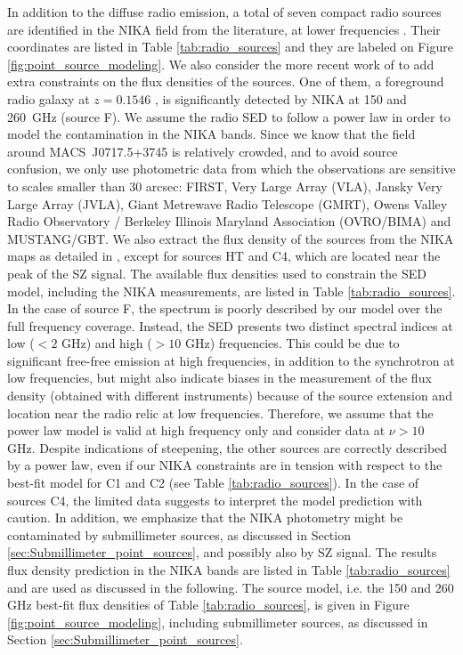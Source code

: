 \documentclass[twocolumn,traditabstract]{aa}
\begin{document}
In addition to the diffuse radio emission, a total of seven compact radio sources are identified in the NIKA field from the literature, at lower frequencies \citep{Condon1998,LaRoque2003,Coble2007,Bonafede2009,vanWeeren2009,Mroczkowski2012,PandeyPommier2013}. Their coordinates are listed in Table \ref{tab:radio_sources} and they are labeled on Figure  \ref{fig:point_source_modeling}. We also consider the more recent work of \cite{vanWeeren2016} to add extra constraints on the flux densities of the sources. One of them, a foreground radio galaxy at $z=0.1546$ \citep{vanWeeren2009}, is significantly detected by NIKA at 150 and 260~GHz (source F). We assume the radio SED to follow a power law in order to model the contamination in the NIKA bands. Since we know that the field around \mbox{MACS~J0717.5+3745} is relatively crowded, and to avoid source confusion, we only use photometric data from which the observations are sensitive to scales smaller than 30 arcsec: FIRST, Very Large Array (VLA), Jansky Very Large Array (JVLA), Giant Metrewave Radio Telescope (GMRT), Owens Valley Radio Observatory / Berkeley Illinois Maryland Association (OVRO/BIMA) and MUSTANG/GBT. We also extract the flux density of the sources from the NIKA maps as detailed in \cite{Adam2016}, except for sources HT and C4, which are located near the peak of the SZ signal. The available flux densities used to constrain the SED model, including the NIKA measurements, are listed in Table \ref{tab:radio_sources}. In the case of source F, the spectrum is poorly described by our model over the full frequency coverage. Instead, the SED presents two distinct spectral indices at low ($<2$ GHz) and high ($>10$ GHz) frequencies. This could be due to significant free-free emission at high frequencies, in addition to the synchrotron at low frequencies, but might also indicate biases in the measurement of the flux density (obtained with different instruments) because of the source extension and location near the radio relic at low frequencies. Therefore, we assume that the power law model is valid at high frequency only and consider data at $\nu > 10$ GHz. Despite indications of steepening, the other sources are correctly described by a power law, even if our NIKA constraints are in tension with respect to the best-fit model for C1 and C2 (see Table \ref{tab:radio_sources}). In the case of sources C4, the limited data suggests to interpret the model prediction with caution. In addition, we emphasize that the NIKA photometry might be contaminated by submillimeter sources, as discussed in Section \ref{sec:Submillimeter_point_sources}, and possibly also by SZ signal. The results flux density prediction in the NIKA bands are listed in Table \ref{tab:radio_sources} and are used as discussed in the following. The source model, i.e. the 150 and 260 GHz best-fit flux densities of Table \ref{tab:radio_sources}, is given in Figure  \ref{fig:point_source_modeling}, including submillimeter sources, as discussed in Section \ref{sec:Submillimeter_point_sources}.
\end{document}
